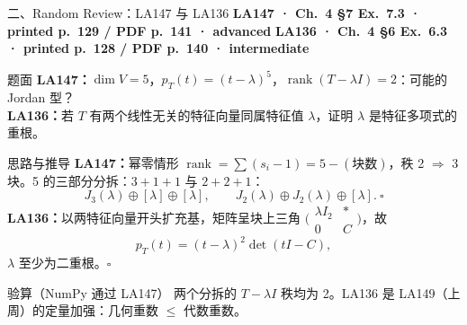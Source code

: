 \documentclass[aspectratio=169,10pt,fontset=none]{ctexbeamer}
\newcommand{\ex}[1]{\textcolor{accent}{\footnotesize\bfseries #1}}
\begin{document}
\begin{frame}[t]{二、Random Review：LA147 与 LA136}
  \leavevmode\ex{LA147 · Ch.~4 §7 Ex.~7.3 · printed p.~129 / PDF p.~141 · advanced}\quad
  \ex{LA136 · Ch.~4 §6 Ex.~6.3 · printed p.~128 / PDF p.~140 · intermediate}
  \begin{block}{\footnotesize 题面}
    \scriptsize \textbf{LA147：}$\dim V=5$，$p_T(t)=(t-\lambda)^5$，$\operatorname{rank}(T-\lambda I)=2$：可能的 Jordan 型？\\
    \textbf{LA136：}若 $T$ 有两个线性无关的特征向量同属特征值 $\lambda$，证明 $\lambda$ 是特征多项式的重根。
  \end{block}
  \begin{exampleblock}{\footnotesize 思路与推导}
    \scriptsize
    \textbf{LA147：}幂零情形 $\operatorname{rank}=\sum(s_i-1)=5-(\text{块数})$，秩 2 $\Rightarrow$ 3 块。5 的三部分分拆：$3+1+1$ 与 $2+2+1$：
    $$J_3(\lambda)\oplus[\lambda]\oplus[\lambda],\qquad J_2(\lambda)\oplus J_2(\lambda)\oplus[\lambda].\ \square$$
    \textbf{LA136：}以两特征向量开头扩充基，矩阵呈块上三角 $\bigl(\begin{smallmatrix}\lambda I_2&*\\0&C\end{smallmatrix}\bigr)$，故
    $$p_T(t)=(t-\lambda)^2\det(tI-C),$$
    $\lambda$ 至少为二重根。$\square$
  \end{exampleblock}
  \begin{block}{\footnotesize 验算（NumPy 通过 LA147）}
    \scriptsize 两个分拆的 $T-\lambda I$ 秩均为 2。LA136 是 LA149（上周）的定量加强：几何重数 $\le$ 代数重数。
  \end{block}
\end{frame}
\end{document}
